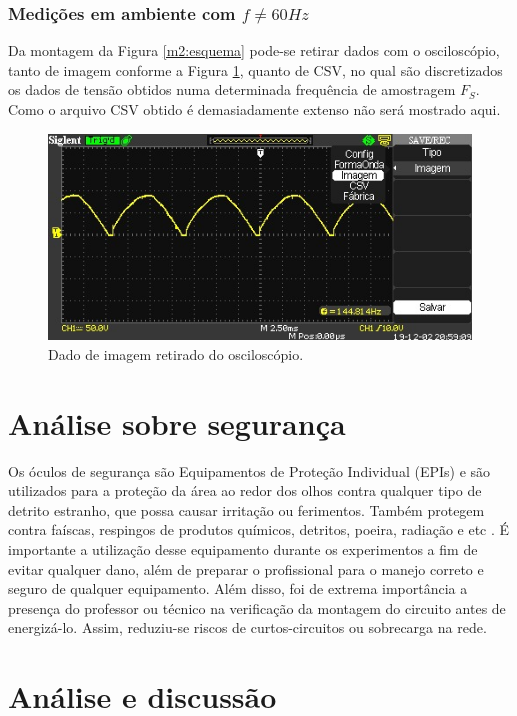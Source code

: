 \documentclass[a4paper,12pt,oneside,openany,table,xcdraw]{article}
\begin{document}
\subsubsection{Medições em ambiente com $f\ne 60Hz$}
Da montagem da Figura \ref{m2:esquema} pode-se retirar dados com o osciloscópio, tanto de imagem conforme a Figura \ref{m2:imagem}, quanto de CSV, no qual são discretizados os dados de tensão obtidos numa determinada frequência de amostragem $F_S$. Como o arquivo CSV obtido é demasiadamente extenso não será mostrado aqui. 

\vspace{1cm}
\begin{figure}[H]
\centering
\includegraphics[width=13cm]{osc001}
\caption{Dado de imagem retirado do osciloscópio.}
\label{m2:imagem}
\end{figure}
\vspace{0.1cm}
 

\section{Análise sobre segurança} %
Os óculos de segurança são Equipamentos de Proteção Individual (EPIs) e são utilizados para a proteção da área ao redor dos olhos contra qualquer tipo de detrito estranho, que possa causar irritação ou ferimentos. Também protegem contra faíscas, respingos de produtos químicos, detritos, poeira, radiação e etc \cite{safe}.
É importante a utilização desse equipamento durante os experimentos a fim de evitar qualquer dano, além de preparar o profissional para o manejo correto e seguro de qualquer equipamento.
Além disso, foi de extrema importância a presença do professor ou técnico na verificação da montagem do circuito antes de energizá-lo. Assim, reduziu-se riscos de curtos-circuitos ou sobrecarga na rede.

\vspace{0.2cm}
\section{Análise e discussão} %
\end{document}
